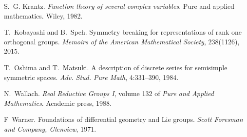\documentclass{article}
\newcommand{\tmtextit}[1]{{\itshape{#1}}}
\numberwithin{definition}{section}
\numberwithin{lemma}{section}
\numberwithin{proposition}{section}
{\theorembodyfont{\rmfamily}\newtheorem{remark}{Remark}
\numberwithin{remark}{section}
}
\begin{document}
\begin{thebibliography}{CK{\O}P11}
  S.~G. Krantz.
  {\newblock}\tmtextit{Function theory of several complex variables}.
  {\newblock}Pure and applied mathematics. Wiley, 1982.
  
  T.~Kobayashi and B.~Speh.
  {\newblock}Symmetry breaking for representations of rank one orthogonal
  groups. {\newblock}\tmtextit{Memoirs of the American Mathematical Society},
  238(1126), 2015.
  
  T.~Oshima and T.~Matsuki. {\newblock}A
  description of discrete series for semisimple symmetric spaces.
  {\newblock}\tmtextit{Adv. Stud. Pure Math}, 4:331--390, 1984.
  
  N.~Wallach. {\newblock}\tmtextit{Real
  Reductive Groups I}, volume 132 of \tmtextit{Pure and Applied Mathematics}.
  {\newblock}Academic press, 1988.
  
  F~Warner. {\newblock}Foundations of
  differential geometry and Lie groups. {\newblock}\tmtextit{Scott Foresman
  and Company, Glenview}, 1971.
\end{thebibliography}
\end{document}
